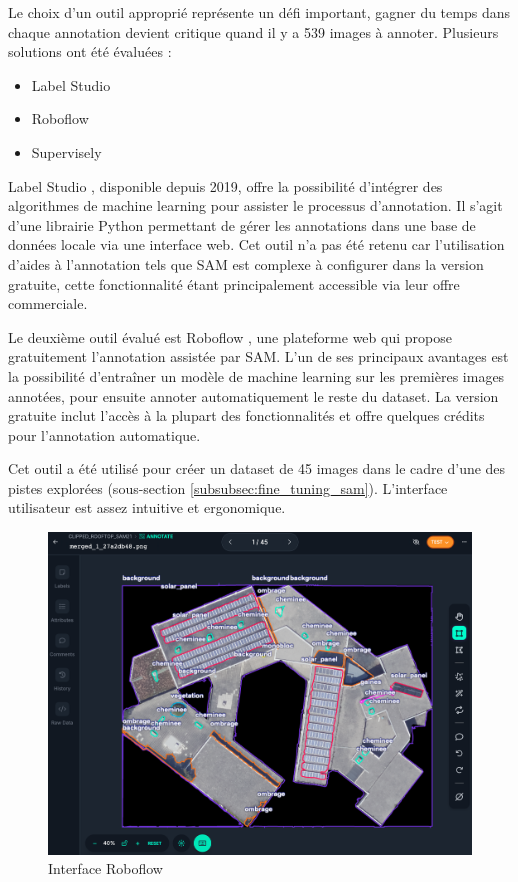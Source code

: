 Le choix d'un outil approprié représente un défi important, gagner du temps dans chaque annotation devient critique quand il y a 539 images à annoter. Plusieurs solutions ont été évaluées :
\begin{itemize}
    \item Label Studio \cite{label_studio_open_nodate}
    \item Roboflow \cite{roboflow_roboflow_nodate}
    \item Supervisely \cite{supervisely_supervisely_nodate}
\end{itemize}

Label Studio \cite{label_studio_open_nodate}, disponible depuis 2019, offre la possibilité d'intégrer des algorithmes de machine learning pour assister le processus d'annotation. Il s'agit d'une librairie Python permettant de gérer les annotations dans une base de données locale via une interface web. Cet outil n'a pas été retenu car l'utilisation d'aides à l'annotation tels que SAM \cite{label_studio_label_nodate} est complexe à configurer dans la version gratuite, cette fonctionnalité étant principalement accessible via leur offre commerciale.

Le deuxième outil évalué est Roboflow \cite{roboflow_roboflow_nodate}, une plateforme web qui propose gratuitement l'annotation assistée par SAM. L'un de ses principaux avantages est la possibilité d'entraîner un modèle de machine learning sur les premières images annotées, pour ensuite annoter automatiquement le reste du dataset. La version gratuite inclut l'accès à la plupart des fonctionnalités et offre quelques crédits pour l'annotation automatique.

Cet outil a été utilisé pour créer un dataset de 45 images dans le cadre d'une des pistes explorées (sous-section \ref{subsubsec:fine_tuning_sam}). L'interface utilisateur est assez intuitive et ergonomique.

\begin{figure}[H]
    \centering
    \includegraphics[width=1\linewidth]{02-main//figures//ch3/ch3_labellisation_01_outils_01_robolfow.png}
    \caption{Interface Roboflow}
    \label{fig:ch3_labellisation_01_outils_01_robolfow}
\end{figure}

